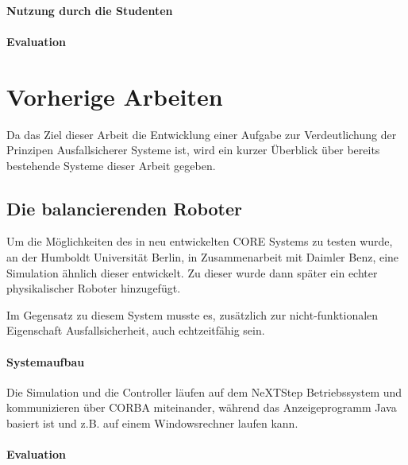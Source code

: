 \documentclass[
    12pt,
    bibliography=totoc,
    ngerman
]{scrartcl}
\begin{document}

\paragraph{Nutzung durch die Studenten} 

\paragraph{Evaluation}

\clearpage
\section{Vorherige Arbeiten}
Da das Ziel dieser Arbeit die Entwicklung einer Aufgabe zur Verdeutlichung der Prinzipen Ausfallsicherer Systeme ist, wird ein kurzer {\"{U}}berblick {\"{u}}ber
bereits bestehende Systeme dieser Arbeit gegeben.

\subsection{Die balancierenden Roboter}
Um die M{\"{o}}glichkeiten des in \cite{Werner00} neu entwickelten CORE Systems zu testen wurde, an der Humboldt Universit{\"{a}}t Berlin, in Zusammenarbeit
mit Daimler Benz, eine Simulation {\"{a}}hnlich dieser entwickelt. Zu dieser wurde dann sp{\"{a}}ter ein echter physikalischer Roboter hinzugef{\"{u}}gt.

Im Gegensatz zu diesem System musste es, zus{\"{a}}tzlich zur nicht-funktionalen Eigenschaft Ausfallsicherheit, auch echtzeitf{\"{a}}hig sein.

\paragraph{Systemaufbau} Die Simulation und die Controller l{\"{a}}ufen auf dem NeXTStep Betriebssystem und kommunizieren {\"{u}}ber CORBA miteinander\cite{predictablecorba}, w{\"{a}}hrend
das Anzeigeprogramm Java basiert ist und z.B. auf einem Windowsrechner laufen kann.


\paragraph{Evaluation} 
\end{document}
